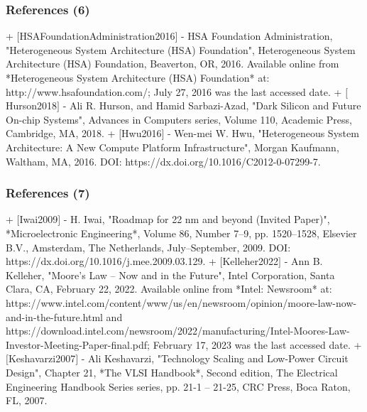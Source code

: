 \begin{frame}
	\frametitle{References (6)}



+ $[$HSAFoundationAdministration2016$]$
	- {HSA Foundation Administration}, "Heterogeneous System Architecture (HSA) Foundation", Heterogeneous System Architecture (HSA) Foundation, Beaverton, {OR}, 2016. Available online from *Heterogeneous System Architecture (HSA) Foundation* at: http://www.hsafoundation.com/; July 27, 2016 was the last accessed date.
+ $[$Hurson2018$]$
	- Ali R. Hurson, and Hamid {Sarbazi-Azad}, "Dark Silicon and Future On-chip Systems", Advances in Computers series, Volume 110, Academic Press, Cambridge, {MA}, 2018.
+ $[$Hwu2016$]$
	- {Wen-mei} W. Hwu, "Heterogeneous System Architecture: A New Compute Platform Infrastructure", Morgan Kaufmann, Waltham, {MA}, 2016. DOI: https://dx.doi.org/10.1016/C2012-0-07299-7.


\end{frame}
















\begin{frame}
	\frametitle{References (7)}


+ $[$Iwai2009$]$
	- H. Iwai, "Roadmap for 22 nm and beyond (Invited Paper)", *Microelectronic Engineering*, Volume 86, Number 7--9, pp. 1520--1528, Elsevier {B.V.}, Amsterdam, {The Netherlands}, July--September, 2009. DOI: https://dx.doi.org/10.1016/j.mee.2009.03.129.
+ $[$Kelleher2022$]$
	- Ann B. Kelleher, "Moore's Law -- Now and in the Future", Intel Corporation, Santa Clara, {CA}, February 22, 2022. Available online from *Intel: Newsroom* at: https://www.intel.com/content/www/us/en/newsroom/opinion/moore-law-now-and-in-the-future.html and https://download.intel.com/newsroom/2022/manufacturing/Intel-Moores-Law-Investor-Meeting-Paper-final.pdf; February 17, 2023 was the last accessed date.
+ $[$Keshavarzi2007$]$
	- Ali Keshavarzi, "Technology Scaling and Low-Power Circuit Design", Chapter 21, *The {VLSI} Handbook*, Second edition, The Electrical Engineering Handbook Series series, pp. 21-1 -- 21-25, {CRC} Press, Boca Raton, {FL}, 2007.




\end{frame}
























